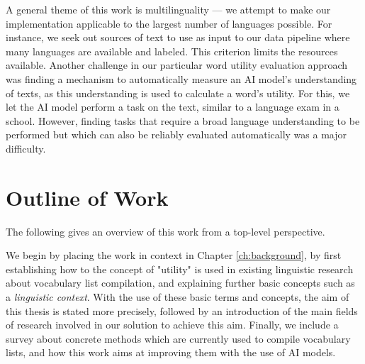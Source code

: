 A general theme of this work is multilinguality --- we attempt to make our implementation applicable to the largest number of languages possible.
For instance, we seek out sources of text to use as input to our data pipeline where many languages are available and labeled.
This criterion limits the resources available.
Another challenge in our particular word utility evaluation approach was finding a mechanism to automatically measure an AI model's understanding of texts, as this understanding is used to calculate a word's utility.
For this, we let the AI model perform a task on the text, similar to a language exam in a school.
However, finding tasks that require a broad language understanding to be performed but which can also be reliably evaluated automatically was a major difficulty.




\section{Outline of Work} \label{sec:outline-of-work}

The following gives an overview of this work from a top-level perspective.

We begin by placing the work in context in Chapter \ref{ch:background}, by first establishing how to the concept of "utility" is used in existing linguistic research about vocabulary list compilation, and explaining further basic concepts such as a \textit{linguistic context}.
With the use of these basic terms and concepts, the aim of this thesis is stated more precisely, followed by an introduction of the main fields of research involved in our solution to achieve this aim.
Finally, we include a survey about concrete methods which are currently used to compile vocabulary lists, and how this work aims at improving them with the use of AI models.

